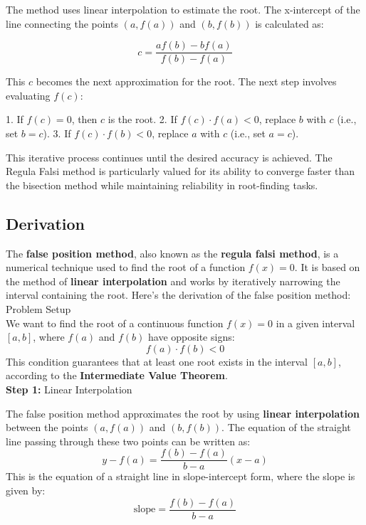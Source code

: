 \documentclass[12pt,a4paper]{article}
\begin{document}
	The method uses linear interpolation to estimate the root. The x-intercept of the line connecting the points \((a, f(a))\) and \((b, f(b))\) is calculated as:
	
	\[
	c = \frac{a f(b) - b f(a)}{f(b) - f(a)}
	\]
	
	This \(c\) becomes the next approximation for the root. The next step involves evaluating \(f(c)\):
	
	1. If \(f(c) = 0\), then \(c\) is the root.
	2. If \(f(c) \cdot f(a) < 0\), replace \(b\) with \(c\) (i.e., set \(b = c\)).
	3. If \(f(c) \cdot f(b) < 0\), replace \(a\) with \(c\) (i.e., set \(a = c\)).
	
	This iterative process continues until the desired accuracy is achieved. The Regula Falsi method is particularly valued for its ability to converge faster than the bisection method while maintaining reliability in root-finding tasks.
	
	\subsection{Derivation}
	The \textbf{false position method}, also known as the \textbf{regula falsi method}, is a numerical technique used to find the root of a function \( f(x) = 0 \). It is based on the method of \textbf{linear interpolation} and works by iteratively narrowing the interval containing the root. Here’s the derivation of the false position method:\\
	
	Problem Setup\\
	
	We want to find the root of a continuous function \( f(x) = 0 \) in a given interval \([a, b]\), where \( f(a) \) and \( f(b) \) have opposite signs:
	\[
	f(a) \cdot f(b) < 0
	\]
	This condition guarantees that at least one root exists in the interval \([a, b]\), according to the \textbf{Intermediate Value Theorem}.\\
	
	\textbf{Step 1:} Linear Interpolation
	
	The false position method approximates the root by using \textbf{linear interpolation} between the points \((a, f(a))\) and \((b, f(b))\). The equation of the straight line passing through these two points can be written as:
	\[
	y - f(a) = \frac{f(b) - f(a)}{b - a} (x - a)
	\]
	This is the equation of a straight line in slope-intercept form, where the slope is given by:
	\[
	\text{slope} = \frac{f(b) - f(a)}{b - a}
	\]
	
\end{document}
